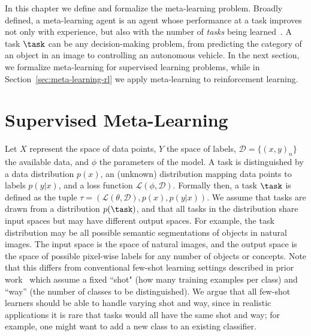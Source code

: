 In this chapter we define and formalize the meta-learning problem.
Broadly defined, a meta-learning agent is an agent whose performance at a task improves not only with experience, but also with the number of \emph{tasks} being learned~\citep{thrun1998learning}. 
A task $\task$ can be any decision-making problem, from predicting the category of an object in an image to controlling an autonomous vehicle.
In the next section, we formalize meta-learning for supervised learning problems, while in Section~\ref{sec:meta-learning-rl} we apply meta-learning to reinforcement learning.

\section{Supervised Meta-Learning}
Let $X$ represent the space of data points, $Y$ the space of labels, $\mathcal{D} = \{(x, y)_n\}$ the available data, and $\phi$ the parameters of the model.
A task is distinguished by a data distribution $p(x)$, an (unknown) distribution mapping data points to labels $p(y|x)$, and a loss function $\mathcal{L}(\phi, \mathcal{D})$.
Formally then, a task $\task$ is defined as the tuple $\tau = (\mathcal{L}(\theta, \mathcal{D}), p(x), p(y|x))$. 
We assume that tasks are drawn from a distribution $p(\task)$, and that all tasks in the distribution share input spaces but may have different output spaces.
For example, the task distribution may be all possible semantic segmentations of objects in natural images. 
The input space is the space of natural images, and the output space is the space of possible pixel-wise labels for any number of objects or concepts.
Note that this differs from conventional few-shot learning settings described in prior work~\citep{vinyals2016matching, finn2017model} which assume a fixed ``shot" (how many training examples per class) and ``way'' (the number of classes to be distinguished). 
We argue that all few-shot learners should be able to handle varying shot and way, since in realistic applications it is rare that tasks would all have the same shot and way; for example, one might want to add a new class to an existing classifier. 

